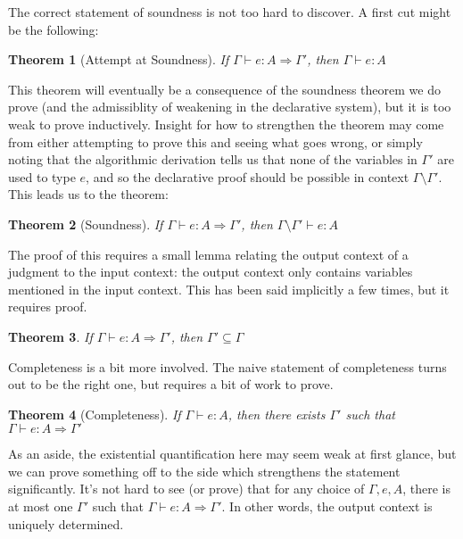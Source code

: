 \documentclass{article}
\newtheorem{theorem}{Theorem}
\theoremstyle{definition}
\newcommand{\gens}{\Rightarrow}
\begin{document}
The correct statement of soundness is not too hard to discover. A first cut might be the following:
\begin{theorem}[Attempt at Soundness]
If $\Gamma \vdash e : A \gens \Gamma'$, then $\Gamma \vdash e : A$
\end{theorem}

This theorem will eventually be a consequence of the soundness theorem we do prove (and the admissiblity of weakening in the declarative system), but it is too weak to prove inductively. Insight for how to strengthen the theorem may come from either attempting to prove this and seeing what goes wrong, or simply noting that the algorithmic derivation tells us that none of the variables in $\Gamma'$ are used to type $e$, and so the declarative proof should be possible in context $\Gamma \setminus \Gamma'$. This leads us to the theorem:

\begin{theorem}[Soundness]
If $\Gamma \vdash e : A \gens \Gamma'$, then $\Gamma \setminus \Gamma' \vdash e : A$
\end{theorem}

The proof of this requires a small lemma relating the output context of a judgment to the input context: the output context only contains variables mentioned in the input context. This has been said implicitly a few times, but it requires proof.

\begin{theorem}
If $\Gamma \vdash e : A \gens \Gamma'$, then $\Gamma' \subseteq \Gamma$
\end{theorem}

Completeness is a bit more involved. The naive statement of completeness turns out to be the right one, but requires a bit of work to prove.

\begin{theorem}[Completeness]
If $\Gamma \vdash e : A$, then there exists $\Gamma'$ such that $\Gamma \vdash e : A \gens \Gamma'$
\end{theorem}

As an aside, the existential quantification here may seem weak at first glance, but we can prove something off to the side which strengthens the statement significantly. It's not hard to see (or prove) that for any choice of $\Gamma,e,A$, there is at most one $\Gamma'$ such that $\Gamma \vdash e : A \gens \Gamma'$. In other words, the output context is uniquely determined.
\end{document}
